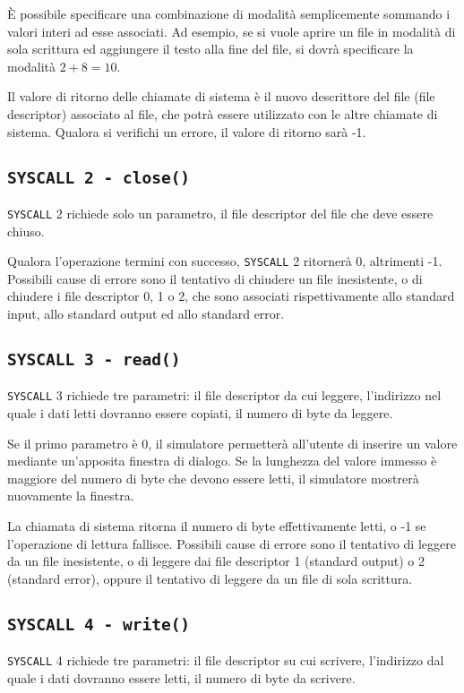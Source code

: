 \documentclass[12pt]{report}
\newcommand{\SC}{\texttt{SYSCALL}}
\begin{document}
\`{E} possibile specificare una combinazione di modalit\`{a} semplicemente sommando i valori interi ad esse associati. 
Ad esempio, se si vuole aprire un file in modalit\`{a} di sola scrittura ed aggiungere il testo alla fine del file, 
si dovr\`{a} specificare la modalit\`{a} $2 + 8 = 10$.

Il valore di ritorno delle chiamate di sistema \`{e} il nuovo descrittore del file (file descriptor) associato al file, 
che potr\`{a} essere utilizzato con le altre chiamate di sistema. Qualora si verifichi un errore, il valore di ritorno sar\`{a} -1.


\subsection{\texttt{SYSCALL 2 - close()}}
\SC{} 2 richiede solo un parametro, il file descriptor del file che deve essere chiuso. 

 Qualora l'operazione termini con successo, \SC{} 2 ritorner\`{a} 0, altrimenti -1. 
 Possibili cause di errore sono il tentativo di chiudere un file inesistente, o di chiudere i file descriptor 0, 1 o 2, 
 che sono associati rispettivamente allo standard input, allo standard output ed allo standard error.

\subsection{\texttt{SYSCALL 3 - read()}}
\SC{} 3 richiede tre parametri: il file descriptor da cui leggere, l'indirizzo nel quale i dati letti 
dovranno essere copiati, il numero di byte da leggere.

Se il primo parametro \`{e} 0, il simulatore permetter\`{a} all'utente di inserire un valore mediante un'apposita finestra di dialogo. 
Se la lunghezza del valore immesso \`{e} maggiore del numero di byte che devono essere letti, il simulatore mostrer\`{a} nuovamente la finestra.

La chiamata di sistema ritorna il numero di byte effettivamente letti, o -1 se l'operazione di lettura fallisce. Possibili cause di errore sono 
il tentativo di leggere da un file inesistente, o di leggere dai file descriptor 1 (standard output) o 2 (standard error), 
oppure il tentativo di leggere da un file di sola scrittura. 

\subsection{\texttt{SYSCALL 4 - write()}}
\SC{} 4 richiede tre parametri: il file descriptor su cui scrivere, l'indirizzo dal quale i dati dovranno essere letti, il numero di byte da scrivere.
\end{document}
